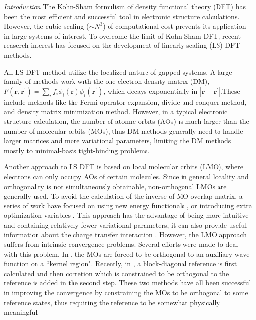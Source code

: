 \documentclass[prl,twocolumn,showpacs]{revtex4}
\begin{document}
\emph{Introduction} 
The Kohn-Sham formulism of density functional theory (DFT)\cite{hohenberg1964inhomogeneous,kohn1965self} has been the most efficient and successful tool in electronic structure calculations. However, the cubic scaling ($\sim N^3$) of computational cost prevents its application in large systems of interest. To overcome the limit of Kohn-Sham DFT, recent reaserch interest has focused on the development of linearly scaling (LS) DFT methods\cite{bowler2012methods,goedecker1999linear}. 

All LS DFT method utilize the localized nature of gapped systems. A large family of methods work with the one-electron density matrix (DM)\cite{li1993density,lee1996linear,li2003density,vandevondele2012linear}, $F(\mathbf{r},\mathbf{r}^{'})=\sum_i f_i \phi_i(\mathbf{r}) \phi_i(\mathbf{r}^{'})$, which decays exponentially in $|\mathbf{r}-\mathbf{r}^{'}|$.These include methods like the Fermi operator expansion\cite{goedecker1994efficient,goedecker1995tight}, divide-and-conquer method\cite{yang1991direct,yang1991local}, and density matrix minimization method\cite{li1993density}. However, in a typical electronic structure calculation, the number of atomic orbits (AOs) is much larger than the number of molecular orbits (MOs), thus DM methods generally need to handle larger matrices and more variational parameters, limiting the DM methods mostly to minimal-basis tight-binding problems. 

Another approach to LS DFT is based on local molecular orbits (LMO), where electrons can only occupy AOs of certain molecules. Since in general locality and orthogonality is not simultaneously obtainable, non-orthogonal LMOs are generally used. To avoid the calculation of the inverse of MO overlap matrix, a series of work have focused on using new energy functionals \cite{mauri1993orbital,kim1995total,ordejon1995linear}, or introducing extra optimization variables \cite{burger2008linear,peng2013effective}. This approach has the advantage of being more intuitive and containing relatively fewer variational parameters, it can also provide useful information about the charge transfer interaction \cite{khaliullin2007unravelling,khaliullin2008analysis}. However, the LMO approach suffers from intrinsic convergence problems\cite{ordejon1995linear,fattebert2004linear}. Several efforts were made to deal with this problem. In \cite{tsuchida2007augmented,tsuchida2008ab}, the MOs are forced to be orthogonal to an auxiliary wave function on a ``kernel region". Recently, in \cite{khaliullin2013efficient}, a block-diagonal reference is first calculated and then corretion which is constrained to be orthogonal to the reference is added in the second step. These two methods have all been successful in improving the convergence by constraining the MOs to be orthogonal to some reference states, thus requiring the reference to be somewhat physically meaningful.
\end{document}
